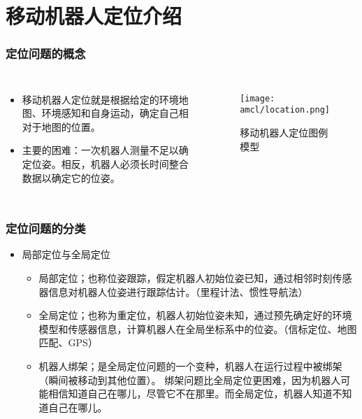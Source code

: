 \section{移动机器人定位介绍}

\begin{comment}
1.机器人定位存在其位姿不能直接感知的问题，换句话说，就是大多数机器人并不拥有测量位姿的无噪声传感器。因此位姿必须从数据推断获得。
2.机器人定位不能通过自身携带的传感器直接感知。因此位姿必须从数据中推断。

\end{comment}

\begin{frame}
  \frametitle{定位问题的概念}
  \begin{columns}
    \begin{itemize}
      \item 移动机器人定位就是根据给定的{\color{red}环境地图}、{\color{red}环境感知}和{\color{red}自身运动}，确定自己相对于地图的位置。
      \item 主要的困难：一次机器人测量不足以确定位姿。相反，机器人必须长时间整合数据以确定它的位姿。
    \end{itemize}
    \begin{figure}
      \texttt{[image: amcl/location.png]}
      \caption{移动机器人定位图例模型}
    \end{figure}
  \end{columns}




  
\end{frame}



\begin{frame}
  \frametitle{定位问题的分类}
  \begin{itemize}
    \item 局部定位与全局定位
    \begin{itemize}
      \item {\color{red}局部定位}；也称位姿跟踪，假定机器人初始位姿已知，通过相邻时刻传感器信息对机器人位姿进行跟踪估计。（里程计法、惯性导航法）
      \item {\color{red}全局定位}；也称为重定位，机器人初始位姿未知，通过预先确定好的环境模型和传感器信息，计算机器人在全局坐标系中的位姿。（信标定位、地图匹配、GPS）
      \item {\color{red}机器人绑架}；是全局定位问题的一个变种，机器人在运行过程中被绑架（瞬间被移动到其他位置）。
            绑架问题比全局定位更困难，因为机器人可能相信知道自己在哪儿，尽管它不在那里。而全局定位，机器人知道不知道自己在哪儿。
    \end{itemize}
  \end{itemize}
  
\end{frame}

